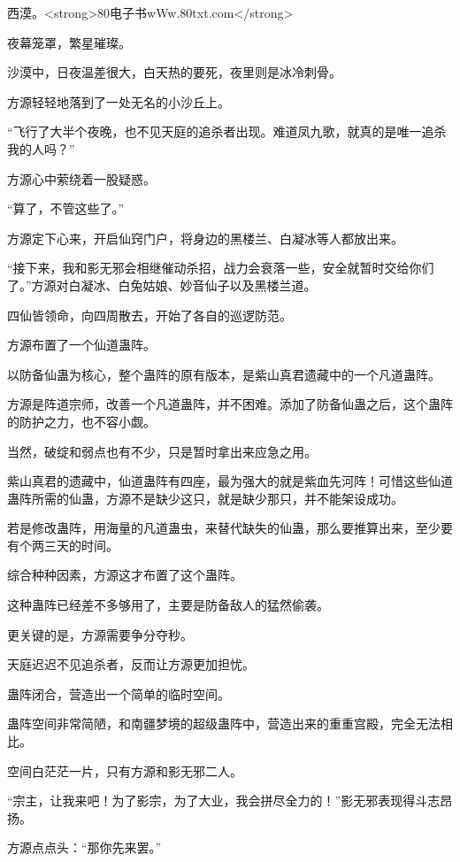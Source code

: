 
\begin{this_body}

西漠。<strong>80电子书wWw.80txt.com</strong>

夜幕笼罩，繁星璀璨。

沙漠中，日夜温差很大，白天热的要死，夜里则是冰冷刺骨。

方源轻轻地落到了一处无名的小沙丘上。

“飞行了大半个夜晚，也不见天庭的追杀者出现。难道凤九歌，就真的是唯一追杀我的人吗？”

方源心中萦绕着一股疑惑。

“算了，不管这些了。”

方源定下心来，开启仙窍门户，将身边的黑楼兰、白凝冰等人都放出来。

“接下来，我和影无邪会相继催动杀招，战力会衰落一些，安全就暂时交给你们了。”方源对白凝冰、白兔姑娘、妙音仙子以及黑楼兰道。

四仙皆领命，向四周散去，开始了各自的巡逻防范。

方源布置了一个仙道蛊阵。

以防备仙蛊为核心，整个蛊阵的原有版本，是紫山真君遗藏中的一个凡道蛊阵。

方源是阵道宗师，改善一个凡道蛊阵，并不困难。添加了防备仙蛊之后，这个蛊阵的防护之力，也不容小觑。

当然，破绽和弱点也有不少，只是暂时拿出来应急之用。

紫山真君的遗藏中，仙道蛊阵有四座，最为强大的就是紫血先河阵！可惜这些仙道蛊阵所需的仙蛊，方源不是缺少这只，就是缺少那只，并不能架设成功。

若是修改蛊阵，用海量的凡道蛊虫，来替代缺失的仙蛊，那么要推算出来，至少要有个两三天的时间。

综合种种因素，方源这才布置了这个蛊阵。

这种蛊阵已经差不多够用了，主要是防备敌人的猛然偷袭。

更关键的是，方源需要争分夺秒。

天庭迟迟不见追杀者，反而让方源更加担忧。

蛊阵闭合，营造出一个简单的临时空间。

蛊阵空间非常简陋，和南疆梦境的超级蛊阵中，营造出来的重重宫殿，完全无法相比。

空间白茫茫一片，只有方源和影无邪二人。

“宗主，让我来吧！为了影宗，为了大业，我会拼尽全力的！”影无邪表现得斗志昂扬。

方源点点头：“那你先来罢。”


\end{this_body}

